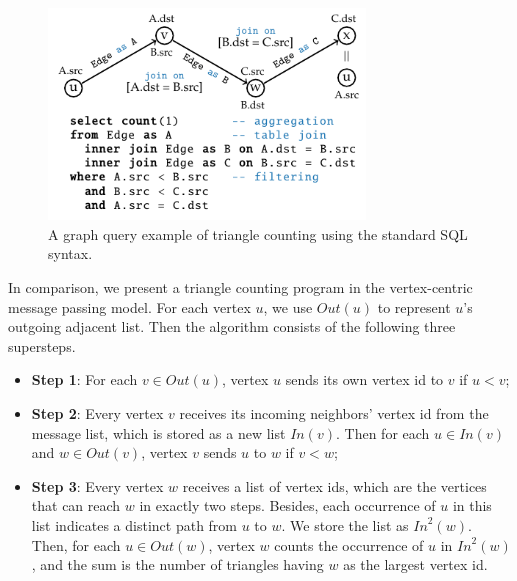 \documentclass{sokendai_thesis} %
\begin{document}



\begin{figure}
\includegraphics[width=0.75\textwidth]{figures/join-tc.pdf}
\caption{A graph query example of triangle counting using the standard SQL syntax.}
\label{fig:join-tc}
\vspace{-5pt}
\end{figure}

In comparison, we present a triangle counting program in the vertex-centric message passing model.
For each vertex $u$, we use $\mathit{Out}(u)$ to represent $u$'s outgoing adjacent list.
Then the algorithm consists of the following three supersteps.
\begin{itemize}
  \item \textbf{Step 1}:
    For each $v\in \mathit{Out}(u)$, vertex $u$ sends its own vertex id to $v$ if $u<v$;
  \item \textbf{Step 2}:
    Every vertex $v$ receives its incoming neighbors' vertex id from the message list, which is stored as a new list $\mathit{In}(v)$.
    Then for each $u\in \mathit{In}(v)$ and $w\in \mathit{Out}(v)$, vertex $v$ sends $u$ to $w$ if $v<w$;
  \item \textbf{Step 3}:
    Every vertex $w$ receives a list of vertex ids, which are the vertices that can reach $w$ in exactly two steps.
    Besides, each occurrence of $u$ in this list indicates a distinct path from $u$ to $w$.
    We store the list as $\mathit{In}^2(w)$.
    Then, for each $u\in \mathit{Out}(w)$, vertex $w$ counts the occurrence of $u$ in $\mathit{In}^2(w)$, and the sum is the number of triangles having $w$ as the largest vertex id.
\end{itemize}
\end{document}
